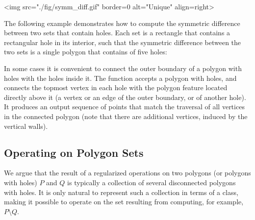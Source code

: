 \lcTex{%
  \setlength{\BooleanSetOpsWidthRight}{2.5cm}
  \setlength{\BooleanSetOpsWidthLeft}{\BooleanSetOpsWidthLineReal}
  \addtolength{\BooleanSetOpsWidthLeft}{-\BooleanSetOpsWidthRight}
  \begin{minipage}{\BooleanSetOpsWidthLeft}
}
\label{fig:sym_diff}
\begin{ccHtmlOnly}
  <img src="./fig/symm_diff.gif" border=0 alt="Unique" align=right>
\end{ccHtmlOnly}
The following example demonstrates how to compute the symmetric
difference between two sets that contain holes. Each set is a
rectangle that contains a rectangular hole in its interior, such that
the symmetric difference between the two sets is a single polygon that
contains of five holes:


In some cases it is convenient to connect the outer boundary of a
polygon with holes with the holes inside it. The
function  accepts a polygon with
holes, and connects the topmost vertex in each hole with the polygon
feature located directly above it (a vertex or an edge of the outer
boundary, or of another hole). It produces an output sequence of
points that match the traversal of all vertices in the connected
polygon (note that there are additional vertices, induced by the
vertical walls).


\subsection{Operating on Polygon Sets\label{bso_ssec:main_component}}

We argue that the result of a regularized operations on two polygons
(or polygons with holes) $P$ and $Q$ is typically a collection of
several disconnected polygons with holes. It is only natural to
represent such a collection in terms of a class, making it possible to
operate on the set resulting from computing, for example, $P \setminus
Q$.

